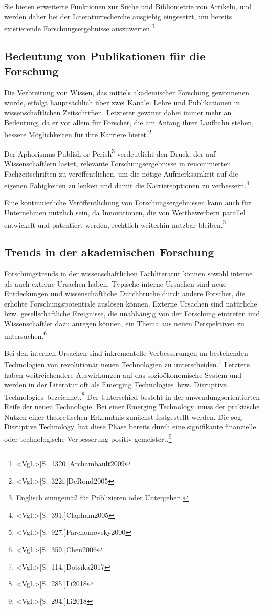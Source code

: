 Sie bieten erweiterte Funktionen zur Suche und Bibliometrie von Artikeln, und werden daher bei der Literaturrecherche ausgiebig eingesetzt, um bereits existierende Forschungsergebnisse auszuwerten.\footnote{\citeNP<Vgl.>[S.~1320.]{Archambault2009}}

\subsection{Bedeutung von Publikationen für die Forschung}
Die Verbreitung von Wissen, das mittels akademischer Forschung gewonnenen wurde, erfolgt hauptsächlich über zwei Kanäle: Lehre und Publikationen in wissenschaftlichen Zeitschriften. Letzterer gewinnt dabei immer mehr an Bedeutung, da er vor allem für Forscher, die am Anfang ihrer Laufbahn stehen, bessere Möglichkeiten für ihre Karriere bietet.\footnote{\citeNP<Vgl.>[S.~322f.]{DeRond2005}}

Der Aphorismus \glqq Publish or Perish\grqq\footnote{Englisch sinngemäß für \glqq Publizieren oder Untergehen\grqq.} verdeutlicht den Druck, der auf Wissenschaftlern lastet, relevante Forschungsergebnisse in renommierten Fachzeitschriften zu veröffentlichen, um die nötige Aufmerksamkeit auf die eigenen Fähigkeiten zu lenken und damit die Karriereoptionen zu verbessern.\footnote{\citeNP<Vgl.>[S.~391.]{Clapham2005}}

Eine kontinuierliche Veröffentlichung von Forschungsergebnissen kann auch für Unternehmen nützlich sein, da Innovationen, die von Wettbewerbern parallel entwickelt und patentiert werden, rechtlich weiterhin nutzbar bleiben.\footnote{\citeNP<Vgl.>[S.~927.]{Parchomovsky2000}}

\subsection{Trends in der akademischen Forschung}
Forschungstrends in der wissenschaftlichen Fachliteratur können sowohl interne als auch externe Ursachen haben. Typische interne Ursachen sind neue Entdeckungen und wissenschaftliche Durchbrüche durch andere Forscher, die erhöhte Forschungspotentiale auslösen können. Externe Ursachen sind natürliche bzw. gesellschaftliche Ereignisse, die unabhängig von der Forschung eintreten und Wissenschaftler dazu anregen können, ein Thema aus neuen Perspektiven zu untersuchen.\footnote{\citeNP<Vgl.>[S.~359.]{Chen2006}}

Bei den internen Ursachen sind inkrementelle Verbesserungen an bestehenden Technologien von revolutionär neuen Technologien zu unterscheiden.\footnote{\citeNP<Vgl.>[S.~114.]{Dotsika2017}} Letztere haben weitreichendere Auswirkungen auf das sozioökonomische System und werden in der Literatur oft als \glqq Emerging Technologies\grqq~bzw. \glqq Disruptive Technologies\grqq~bezeichnet.\footnote{\citeNP<Vgl.>[S.~285.]{Li2018}} Der Unterschied besteht in der anwendungsorientierten Reife der neuen Technologie. Bei einer \glqq Emerging Technology\grqq~muss der praktische Nutzen einer theoretischen Erkenntnis zunächst festgestellt werden. Die sog. \glqq Disruptive Technology\grqq~hat diese Phase bereits durch eine signifikante finanzielle oder technologische Verbesserung positiv gemeistert.\footnote{\citeNP<Vgl.>[S.~294.]{Li2018}}

